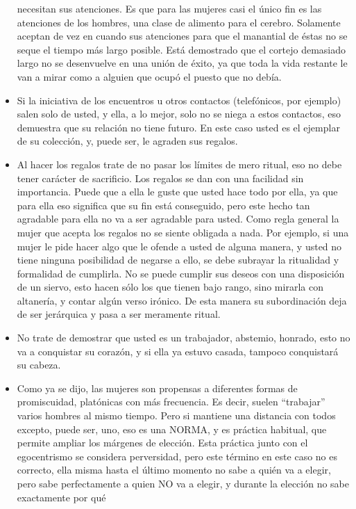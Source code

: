 \begin{itemize}
  necesitan sus atenciones. Es que para las mujeres casi el único fin es
  las atenciones de los hombres, una clase de alimento para el cerebro.
  Solamente aceptan de vez en cuando sus atenciones para que el
  manantial de éstas no se seque el tiempo más largo posible. Está
  demostrado que el cortejo demasiado largo no se desenvuelve en una
  unión de éxito, ya que toda la vida restante le van a mirar como a
  alguien que ocupó el puesto que no debía.
\item
  Si la iniciativa de los encuentros u otros contactos (telefónicos, por
  ejemplo) salen solo de usted, y ella, a lo mejor, solo no se niega a
  estos contactos, eso demuestra que su relación no tiene futuro. En
  este caso usted es el ejemplar de su colección, y, puede ser, le
  agraden sus regalos.
\item
  Al hacer los regalos trate de no pasar los límites de mero ritual, eso
  no debe tener carácter de sacrificio. Los regalos se dan con una
  facilidad sin importancia. Puede que a ella le guste que usted hace
  todo por ella, ya que para ella eso significa que su fin está
  conseguido, pero este hecho tan agradable para ella no va a ser
  agradable para usted. Como regla general la mujer que acepta los
  regalos no se siente obligada a nada. Por ejemplo, si una mujer le
  pide hacer algo que le ofende a usted de alguna manera, y usted no
  tiene ninguna posibilidad de negarse a ello, se debe subrayar la
  ritualidad y formalidad de cumplirla. No se puede cumplir sus deseos
  con una disposición de un siervo, esto hacen sólo los que tienen bajo
  rango, sino mirarla con altanería, y contar algún verso irónico. De
  esta manera su subordinación deja de ser jerárquica y pasa a ser
  meramente ritual.
\item
  No trate de demostrar que usted es un trabajador, abstemio, honrado,
  esto no va a conquistar su corazón, y si ella ya estuvo casada,
  tampoco conquistará su cabeza.
\item
  Como ya se dijo, las mujeres son propensas a diferentes formas de
  promiscuidad, platónicas con más frecuencia. Es decir, suelen
  ``trabajar'' varios hombres al mismo tiempo. Pero si mantiene una
  distancia con todos excepto, puede ser, uno, eso es una NORMA, y es
  práctica habitual, que permite ampliar los márgenes de elección. Esta
  práctica junto con el egocentrismo se considera perversidad, pero este
  término en este caso no es correcto, ella misma hasta el último
  momento no sabe a quién va a elegir, pero sabe perfectamente a quien
  NO va a elegir, y durante la elección no sabe exactamente por qué

\end{itemize}
